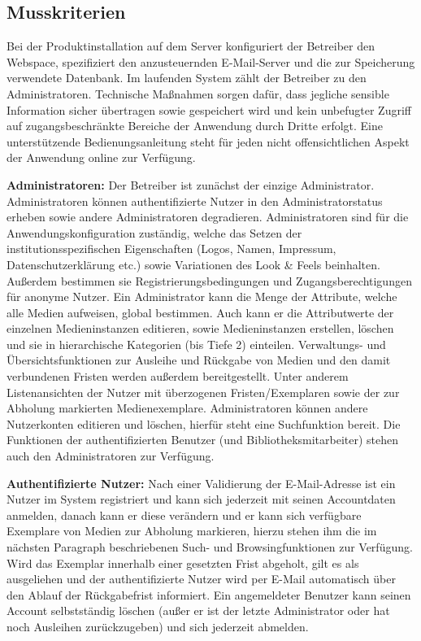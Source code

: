 \documentclass{article}
\begin{document}
\subsection{Musskriterien}
Bei der Produktinstallation auf dem Server konfiguriert der Betreiber den Webspace, spezifiziert den anzusteuernden E-Mail-Server und die zur Speicherung verwendete Datenbank. Im laufenden System zählt der Betreiber zu den Administratoren. Technische Maßnahmen sorgen dafür, dass jegliche sensible Information sicher übertragen sowie gespeichert wird und kein unbefugter Zugriff auf zugangsbeschränkte Bereiche der Anwendung durch Dritte erfolgt. Eine unterstützende Bedienungsanleitung steht für jeden nicht offensichtlichen Aspekt der Anwendung online zur Verfügung.
\begin{flushleft}
\textbf{Administratoren:} Der Betreiber ist zunächst der einzige Administrator. Administratoren können authentifizierte Nutzer in den Administratorstatus erheben sowie andere Administratoren degradieren. Administratoren sind für die Anwendungskonfiguration zuständig, welche das Setzen der institutionsspezifischen Eigenschaften (Logos, Namen, Impressum, Datenschutzerklärung etc.) sowie Variationen des Look \& Feels beinhalten. Außerdem bestimmen sie Registrierungsbedingungen und Zugangsberechtigungen für anonyme Nutzer. Ein Administrator kann die Menge der Attribute, welche alle Medien aufweisen, global bestimmen. Auch kann er die Attributwerte der einzelnen Medieninstanzen editieren, sowie Medieninstanzen erstellen, löschen und sie in hierarchische Kategorien (bis Tiefe 2) einteilen. Verwaltungs- und Übersichtsfunktionen zur Ausleihe und Rückgabe von Medien und den damit verbundenen Fristen werden außerdem bereitgestellt. Unter anderem Listenansichten der Nutzer mit überzogenen Fristen/Exemplaren sowie der zur Abholung markierten Medienexemplare. Administratoren können andere Nutzerkonten editieren und löschen, hierfür steht eine Suchfunktion bereit. Die Funktionen der authentifizierten Benutzer (und Bibliotheksmitarbeiter) stehen auch den Administratoren zur Verfügung.
\end{flushleft}
\begin{flushleft}
\textbf{Authentifizierte Nutzer:} Nach einer Validierung der E-Mail-Adresse ist ein Nutzer im System registriert und kann sich jederzeit mit seinen Accountdaten anmelden, danach kann er diese verändern und er kann sich verfügbare Exemplare von Medien zur Abholung markieren, hierzu stehen ihm die im nächsten Paragraph beschriebenen Such- und Browsingfunktionen zur Verfügung. Wird das Exemplar innerhalb einer gesetzten Frist abgeholt, gilt es als ausgeliehen und der authentifizierte Nutzer wird per E-Mail automatisch über den Ablauf der Rückgabefrist informiert. Ein angemeldeter Benutzer kann seinen Account selbstständig löschen (außer er ist der letzte Administrator oder hat noch Ausleihen zurückzugeben) und sich jederzeit abmelden.
\end{flushleft}
\end{document}
